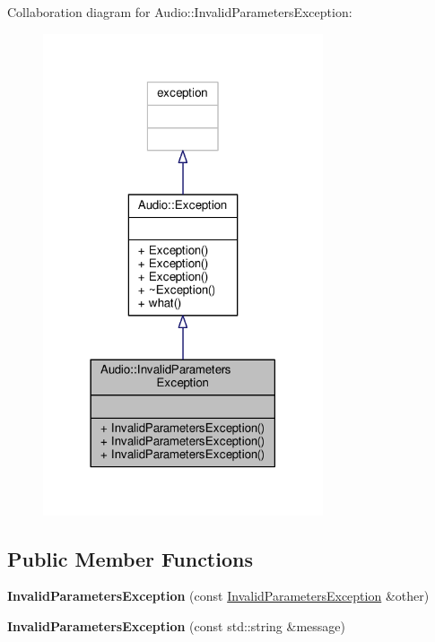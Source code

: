 Collaboration diagram for Audio\+:\+:Invalid\+Parameters\+Exception\+:
\nopagebreak
\begin{figure}[H]
\begin{center}
\leavevmode
\includegraphics[width=234pt]{d0/dc7/classAudio_1_1InvalidParametersException__coll__graph}
\end{center}
\end{figure}
\subsection*{Public Member Functions}
\begin{DoxyCompactItemize}
\item 
{\bfseries Invalid\+Parameters\+Exception} (const \hyperlink{classAudio_1_1InvalidParametersException}{Invalid\+Parameters\+Exception} \&other)\hypertarget{classAudio_1_1InvalidParametersException_ae4668f411018eef36324b10f5e1d7870}{}\label{classAudio_1_1InvalidParametersException_ae4668f411018eef36324b10f5e1d7870}

\item 
{\bfseries Invalid\+Parameters\+Exception} (const std\+::string \&message)\hypertarget{classAudio_1_1InvalidParametersException_a92489262a867af7f4825572d5c04d2f0}{}\label{classAudio_1_1InvalidParametersException_a92489262a867af7f4825572d5c04d2f0}

\end{DoxyCompactItemize}


